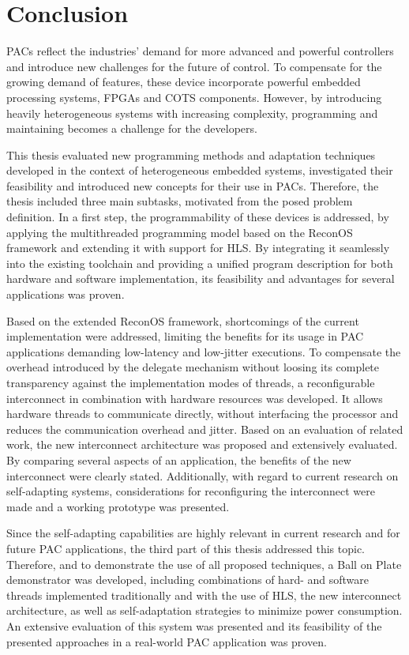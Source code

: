 \chapter{Conclusion}
\label{sec:conclusion}
\aclp{PAC} reflect the industries' demand for more advanced and powerful
controllers and introduce new challenges for the future of control. To
compensate for the growing demand of features, these device incorporate
powerful embedded processing systems, \acp{FPGA} and \ac{COTS} components.
However, by introducing heavily heterogeneous systems with increasing
complexity, programming and maintaining becomes a challenge for the
developers.

This thesis evaluated new programming methods and adaptation
techniques developed in the context of heterogeneous embedded systems,
investigated their feasibility and introduced new concepts for their use in
\acp{PAC}. Therefore, the thesis included three main subtasks, motivated from
the posed problem definition. In a first step, the programmability of these
devices is addressed, by applying the multithreaded programming model based on
the ReconOS framework and extending it with support for \ac{HLS}. By
integrating it seamlessly into the existing toolchain and providing a unified
program description for both hardware and software implementation, its
feasibility and advantages for several applications was proven.

Based on the extended ReconOS framework, shortcomings of the current
implementation were addressed, limiting the benefits for its usage in
\ac{PAC} applications demanding low-latency and low-jitter executions. To
compensate the overhead introduced by the delegate mechanism without loosing
its complete transparency against the implementation modes of threads, a
reconfigurable interconnect in combination with hardware resources was
developed. It allows hardware threads to communicate directly, without
interfacing the processor and reduces the communication overhead and jitter.
Based on an evaluation of related work, the new interconnect architecture was
proposed and extensively evaluated. By comparing several aspects of an
application, the benefits of the new interconnect were clearly stated.
Additionally, with regard to current research on self-adapting systems,
considerations for reconfiguring the interconnect were made and a working
prototype was presented.

Since the self-adapting capabilities are highly relevant in current research
and for future \ac{PAC} applications, the third part of this thesis addressed
this topic. Therefore, and to demonstrate the use of all proposed techniques,
a Ball on Plate demonstrator was developed, including combinations of hard-
and software threads implemented traditionally and with the use of
\ac{HLS}, the new interconnect architecture, as well as self-adaptation
strategies to minimize power consumption. An extensive evaluation of this
system was presented and its feasibility of the presented approaches in a
real-world \ac{PAC} application was proven.

